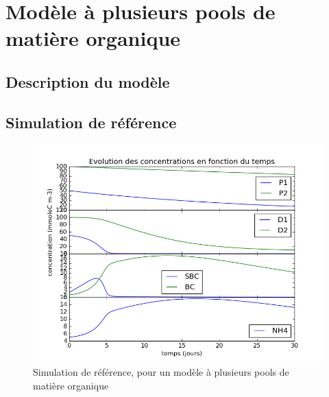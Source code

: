 \section{Mod\`ele \`a plusieurs pools de matière organique}
\subsection{Description du mod\`ele}

\subsection{Simulation de r\'ef\'erence}

\begin{figure}[h!]
  \includegraphics[width=\textwidth]{partie2/Ref.png}
  \caption{Simulation de r\'ef\'erence, pour un mod\`ele \`a plusieurs pools de mati\`ere organique
  }
  \label{fig:partie2ref}
\end{figure}

